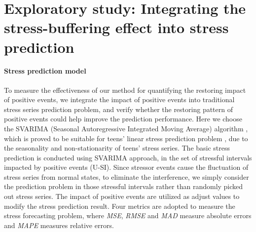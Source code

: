 \section{Exploratory study: Integrating the stress-buffering effect into stress prediction}
\paragraph{Stress prediction model}
To measure the effectiveness of our method for quantifying the restoring impact of positive events,
we integrate the impact of positive events into traditional stress series prediction problem,
and verify whether the restoring pattern of positive events could help improve the prediction performance.
Here we choose the SVARIMA (Seasonal Autoregressive Integrated Moving Average) algorithm \cite{Shumway2006Time},
which is proved to be suitable for teens' linear stress prediction problem \cite{Li2015Predicting},
due to the seasonality and non-stationarity of teens' stress series.
The basic stress prediction is conducted using SVARIMA approach,
in the set of stressful intervals impacted by positive events (U-SI).
Since stressor events cause the fluctuation of stress series from normal states,
to eliminate the interference,
we simply consider the prediction problem in those stressful intervals rather than randomly picked out stress series.
The impact of positive events are utilized as adjust values to modify the stress prediction result.
Four metrics are adopted to measure the stress forecasting problem,
where \emph{MSE}, \emph{RMSE} and \emph{MAD} measure absolute errors and \emph{MAPE} measures relative errors.

